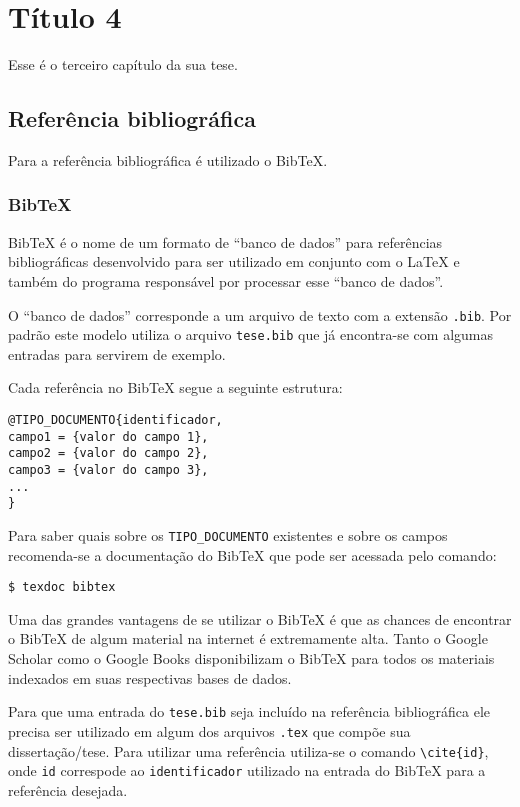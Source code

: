 \chapter{Título 4}
Esse é o terceiro capítulo da sua tese.

\section{Referência bibliográfica}
Para a referência bibliográfica é utilizado o BibTeX.

\subsection{BibTeX}
BibTeX é o nome de um formato de ``banco de dados'' para referências
bibliográficas desenvolvido para ser utilizado em conjunto com o LaTeX e também
do programa responsável por processar esse ``banco de dados''.

O ``banco de dados'' corresponde a um arquivo de texto com a extensão
\lstinline+.bib+. Por padrão este modelo utiliza o arquivo \lstinline+tese.bib+
que já encontra-se com algumas entradas para servirem de exemplo.

Cada referência no BibTeX segue a seguinte estrutura:
\begin{lstlisting}
@TIPO_DOCUMENTO{identificador,
campo1 = {valor do campo 1},
campo2 = {valor do campo 2},
campo3 = {valor do campo 3},
...
}
\end{lstlisting}

Para saber quais sobre os \lstinline+TIPO_DOCUMENTO+ existentes e sobre os
campos recomenda-se a documentação do BibTeX que pode ser acessada pelo comando:
\begin{lstlisting}
$ texdoc bibtex
\end{lstlisting}

Uma das grandes vantagens de se utilizar o BibTeX é que as chances de encontrar
o BibTeX de algum material na internet é extremamente alta. Tanto o Google
Scholar como o Google Books disponibilizam o BibTeX para todos os materiais
indexados em suas respectivas bases de dados.

Para que uma entrada do \lstinline+tese.bib+ seja incluído na referência
bibliográfica ele precisa ser utilizado em algum dos arquivos \lstinline+.tex+
que compõe sua dissertação/tese. Para utilizar uma referência utiliza-se
o comando \lstinline+\cite{id}+, onde
\lstinline+id+ correspode ao \lstinline+identificador+ utilizado na entrada do
BibTeX para a referência desejada.

